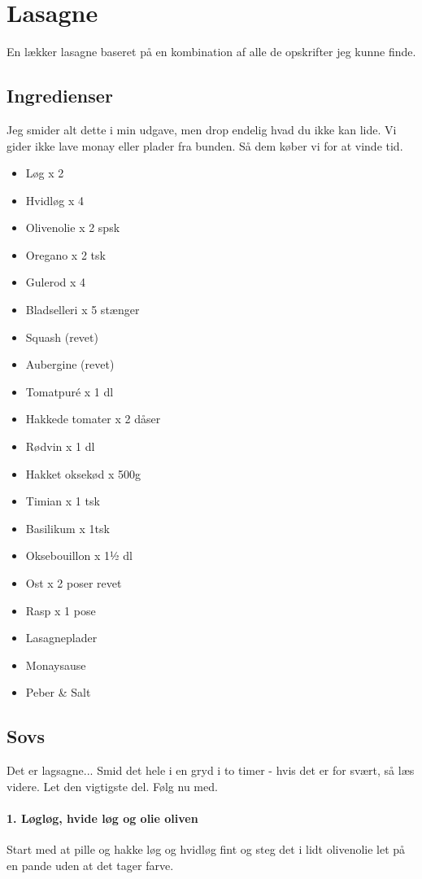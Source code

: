 \section{Lasagne}
En lækker lasagne baseret på en kombination af alle de opskrifter jeg kunne finde.

\subsection{Ingredienser}
Jeg smider alt dette i min udgave, men drop endelig hvad du ikke kan lide. Vi gider ikke lave monay eller plader fra bunden. Så dem køber vi for at vinde tid.

\begin{multicols}{2	}
	\begin{itemize}
		\item Løg x 2
		\item Hvidløg x 4
		\item Olivenolie x 2 spsk
		\item Oregano x 2 tsk
		\item Gulerod x 4
		\item Bladselleri x 5 stænger
		\item Squash (revet)
		\item Aubergine (revet)
		\item Tomatpuré x 1 dl
		\item Hakkede tomater x 2 dåser
		\item Rødvin x 1 dl
		\item Hakket oksekød x 500g
		\item Timian x 1 tsk
		\item Basilikum x 1tsk
		\item Oksebouillon x 1½ dl
		\item Ost x 2 poser revet
		\item Rasp x 1 pose
		\item Lasagneplader
		\item Monaysause
		\item Peber \& Salt
	\end{itemize}
\end{multicols}

\subsection{Sovs}
Det er lagsagne... Smid det hele i en gryd i to timer - hvis det er for svært, så læs videre. Let den vigtigste del. Følg nu med.


\paragraph*{1. Løgløg, hvide løg og olie oliven}
Start med at pille og hakke løg og hvidløg fint og steg det i lidt olivenolie let på en pande uden at det tager farve.

